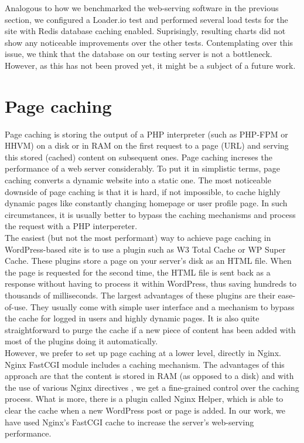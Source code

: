 Analogous to how we benchmarked the web-serving software in the previous section, we configured a Loader.io test and performed several load tests for the site with Redis database caching enabled. Suprisingly, resulting charts did not show any noticeable improvements \cite{Loader.io:nginx_hhvm_redis} over the other tests. Contemplating over this issue, we think that the database on our testing server is not a bottleneck. However, as this has not been proved yet, it might be a subject of a future work.

\section{Page caching} \label{page-caching}

Page caching is storing the output of a PHP interpreter (such as PHP-FPM or HHVM) on a disk or in RAM on the first request to a page (URL) and serving this stored (cached) content on subsequent ones. Page caching increses the performance of a web server considerably. To put it in simplistic terms, page caching converts a dynamic website into a static one. The most noticeable downside of page caching is that it is hard, if not impossible, to cache highly dynamic pages like constantly changing homepage or user profile page. In such circumstances, it is usually better to bypass the caching mechanisms and process the request with a PHP interpereter. \\

The easiest (but not the most performant) way to achieve page caching in WordPress-based site is to use a plugin such as W3 Total Cache or WP Super Cache. These plugins store a page on your server's disk as an HTML file. When the page is requested for the second time, the HTML file is sent back as a response without having to process it within WordPress, thus saving hundreds to thousands of milliseconds. The largest advantages of these plugins are their ease-of-use. They usually come with simple user interface and a mechanism to bypass the cache for logged in users and highly dynamic pages. It is also quite straightforward to purge the cache if a new piece of content has been added with most of the plugins doing it automatically. \\

However, we prefer to set up page caching at a lower level, directly in Nginx. Nginx FastCGI module \cite{Nginx:FastCGI-module} includes a caching mechanism. The advantages of this approach are that the content is stored in RAM (as opposed to a disk) and with the use of various Nginx directives \cite{Nginx:directives}, we get a fine-grained control over the caching process. What is more, there is a plugin called Nginx Helper, which is able to clear the cache when a new WordPress post or page is added. In our work, we have used Nginx's FastCGI cache to increase the server's web-serving performance. \\


